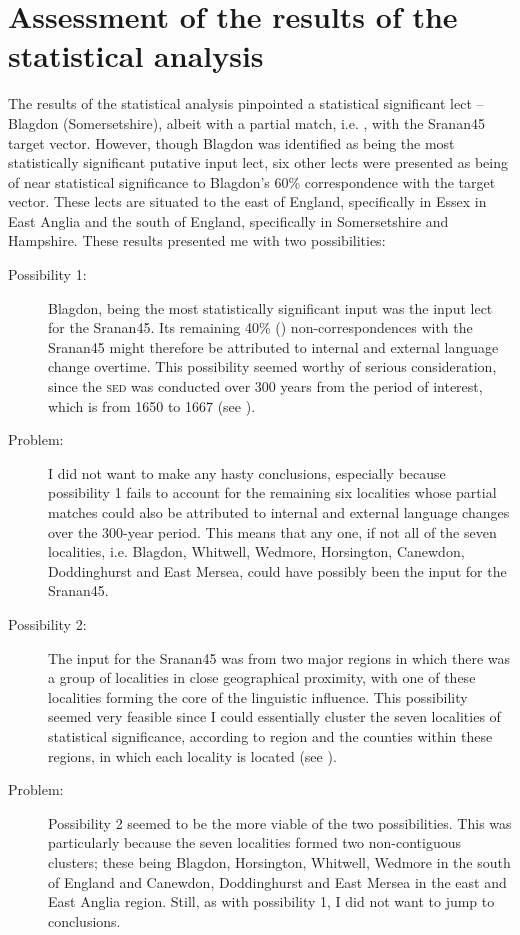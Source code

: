 \section{Assessment of the results of the statistical analysis}
The results of the statistical analysis pinpointed a statistical significant lect -- Blagdon (Somersetshire), albeit with a partial match, i.e. , with the Sranan45 target vector. However, though Blagdon was identified as being the most statistically significant putative input lect, six other lects were presented as being of near statistical significance to Blagdon's 60\% correspondence with the target vector. These lects are situated to the east of England, specifically in Essex in East Anglia and the south of England, specifically in Somersetshire and Hampshire. These results presented me with two possibilities:

\begin{description}
\item[Possibility 1:] Blagdon, being the most statistically significant input was the input lect for the Sranan45. Its remaining 40\% () non-correspondences with the Sranan45 might therefore be attributed to internal and external language change overtime. This possibility seemed worthy of serious consideration, since the \textsc{sed} was conducted over 300 years from the period of interest, which is from 1650 to 1667 (see ).
\item[Problem:] I did not want to make any hasty conclusions, especially because possibility 1 fails to account for the remaining six localities whose partial matches could also be attributed to internal and external language changes over the 300-year period. This means that any one, if not all of the seven localities, i.e. Blagdon, Whitwell, Wedmore, Horsington, Canewdon, Doddinghurst and East Mersea, could have possibly been the input for the  Sranan45.
\item[Possibility 2:] The input for the Sranan45 was from two major regions in which there was a group of localities in close geographical proximity, with one of these localities forming the core of the linguistic influence. This possibility seemed very feasible since I could essentially cluster the seven localities of statistical significance, according to region and the counties within these regions, in which each locality is located (see ).
\item[Problem:] Possibility 2 seemed to be the more viable of the two possibilities. This was particularly because the seven localities formed two non-contiguous clusters; these being Blagdon, Horsington, Whitwell, Wedmore in the  south of England and Canewdon, Doddinghurst and East Mersea in the east and East Anglia region. Still, as with possibility 1, I did not want to jump to conclusions.
\end{description}

